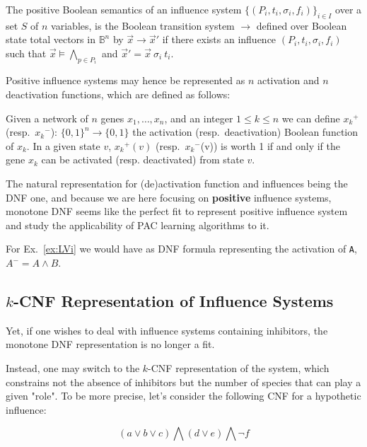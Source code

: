\documentclass{llncs}
\newcommand{\lra}{\longrightarrow}
\begin{document}
\begin{definition}
	The positive Boolean semantics of an influence system $\{(P_i, t_i, \sigma_i, f_i)\}_{i\in I}$
	over a set $S$ of $n$ variables,
	is the Boolean transition system $\lra$ defined over Boolean state total vectors in $\mathbb{B}^n$
	by
	${\vec x}\lra{\vec x'}$ if there exists an influence $(P_i, t_i, \sigma_i, f_i)$
	such that ${\vec x}\models \bigwedge_{p\in P_i}$
	and ${\vec x'} = {\vec x}\ \sigma_i\ t_i$.
\end{definition}

Positive influence systems may hence be represented as $n$ activation and $n$ deactivation functions, which are defined as follows:


\begin{definition}
	\label{def:activation}
	Given a network of $n$ genes $x_1,\ldots,x_n$, and
	an integer $1 \leq k \leq n$ we can define ${x_k}^+$ (resp.\ ${x_k}^-$):
	${\{0,1\}}^n \rightarrow\{0,1\}$ the activation (resp.\ deactivation)
	Boolean function of $x_k$. In a given state $v$, ${x_k}^+(v)$ (resp.\ ${x_k}^-$(v)) is worth 1 if and only if the gene $x_k$ can be activated (resp. deactivated) from state $v$.
\end{definition}

The natural representation for (de)activation function and influences being the DNF one, and because we are here focusing on \textbf{positive} influence systems, monotone DNF seems like the perfect fit to represent positive influence system and study the applicability of PAC learning algorithms to it.

For Ex.~\ref{ex:LVi} we would have as DNF formula representing the activation
of \texttt{A}, $A^-=A \wedge B$.

\subsection{$k$-CNF Representation of Influence Systems}

Yet, if one wishes to deal with influence systems containing inhibitors, the monotone DNF representation is no longer a fit.

Instead, one may switch to the $k$-CNF representation of the system, which constrains not the absence of inhibitors but the number of species that can play a given "role". To be more precise, let's consider the following CNF for a hypothetic influence:

\[
\left(a \vee b \vee c\right) \bigwedge
\left(d \vee e\right) \bigwedge 
\neg f
\]
\end{document}
